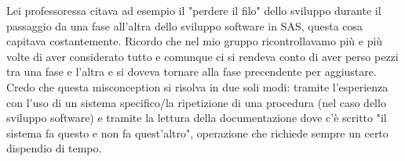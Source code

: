 \documentclass[a4paper]{article}
\begin{document}
Lei professoressa citava ad esempio il "perdere il filo" dello sviluppo durante il passaggio da una fase all'altra dello sviluppo software in SAS, questa cosa capitava costantemente.
Ricordo che nel mio gruppo ricontrollavamo più e più volte di aver considerato tutto e comunque ci si rendeva conto di aver perso pezzi tra una fase e l'altra e si doveva tornare alla fase precendente per aggiustare.
Credo che questa misconception si risolva in due soli modi: tramite l'esperienza con l'uso di un sistema specifico/la ripetizione di una procedura (nel caso dello sviluppo software) e tramite la lettura della documentazione dove c'è scritto "il sistema fa questo e non fa quest'altro", operazione che richiede sempre un certo dispendio di tempo.
\end{document}
